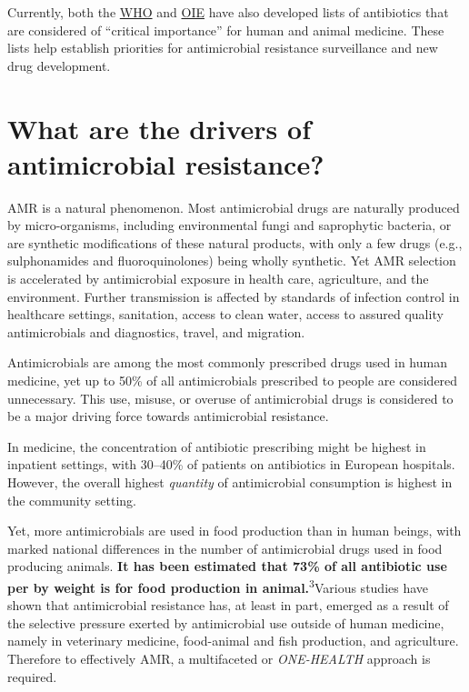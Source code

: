 \documentclass[
]{book}
\begin{document}
Currently, both the \href{https://apps.who.int/iris/bitstream/handle/10665/312266/9789241515528-eng.pdf}{WHO} and \href{https://www.oie.int/en/what-we-do/global-initiatives/antimicrobial-resistance/\#ui-id-4}{OIE} have also developed lists of antibiotics that are considered of ``critical importance'' for human and animal medicine. These lists help establish priorities for antimicrobial resistance surveillance and new drug development.

\hypertarget{what-are-the-drivers-of-antimicrobial-resistance}{%
\section*{What are the drivers of antimicrobial resistance?}\label{what-are-the-drivers-of-antimicrobial-resistance}}

AMR is a natural phenomenon. Most antimicrobial drugs are naturally produced by micro-organisms, including environmental fungi and saprophytic bacteria, or are synthetic modifications of these natural products, with only a few drugs (e.g., sulphonamides and fluoroquinolones) being wholly synthetic. Yet AMR selection is accelerated by antimicrobial exposure in health care, agriculture, and the environment. Further transmission is affected by standards of infection control in healthcare settings, sanitation, access to clean water, access to assured quality antimicrobials and diagnostics, travel, and migration.

Antimicrobials are among the most commonly prescribed drugs used in human medicine, yet up to 50\% of all antimicrobials prescribed to people are considered unnecessary. This use, misuse, or overuse of antimicrobial drugs is considered to be a major driving force towards antimicrobial resistance.

In medicine, the concentration of antibiotic prescribing might be highest in inpatient settings, with 30--40\% of patients on antibiotics in European hospitals. However, the overall highest \emph{quantity} of antimicrobial consumption is highest in the community setting.

Yet, more antimicrobials are used in food production than in human beings, with marked national differences in the number of antimicrobial drugs used in food producing animals. \textbf{It has been estimated that 73\% of all antibiotic use per by weight is for food production in animal.}\textsuperscript{3}Various studies have shown that antimicrobial resistance has, at least in part, emerged as a result of the selective pressure exerted by antimicrobial use outside of human medicine, namely in veterinary medicine, food-animal and fish production, and agriculture. Therefore to effectively AMR, a multifaceted or \emph{ONE-HEALTH} approach is required.
\end{document}

